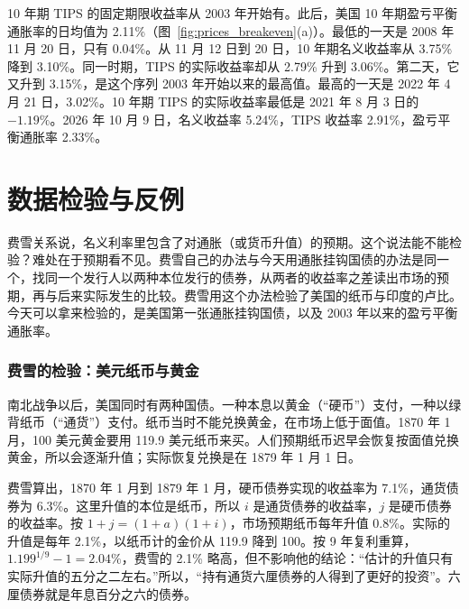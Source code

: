 10 年期 TIPS 的固定期限收益率从 2003 年开始有。此后，美国 10 年期盈亏平衡通胀率的日均值为 2.11\%（图~\ref{fig:prices_breakeven}(a)）。最低的一天是 2008 年 11 月 20 日，只有 0.04\%。从 11 月 12 日到 20 日，10 年期名义收益率从 3.75\% 降到 3.10\%。同一时期，TIPS 的实际收益率却从 2.79\% 升到 3.06\%。第二天，它又升到 3.15\%，是这个序列 2003 年开始以来的最高值。最高的一天是 2022 年 4 月 21 日，3.02\%。10 年期 TIPS 的实际收益率最低是 2021 年 8 月 3 日的 $-1.19\%$。2026 年 10 月 9 日，名义收益率 5.24\%，TIPS 收益率 2.91\%，盈亏平衡通胀率 2.33\%\cite{fred2026}。


\section{数据检验与反例}\label{sec:prices-test}

费雪关系说，名义利率里包含了对通胀（或货币升值）的预期。这个说法能不能检验？难处在于预期看不见。费雪自己的办法与今天用通胀挂钩国债的办法是同一个，找同一个发行人以两种本位发行的债券，从两者的收益率之差读出市场的预期，再与后来实际发生的比较。费雪用这个办法检验了美国的纸币与印度的卢比。今天可以拿来检验的，是美国第一张通胀挂钩国债，以及 2003 年以来的盈亏平衡通胀率。

\subsubsection{费雪的检验：美元纸币与黄金}
南北战争以后，美国同时有两种国债。一种本息以黄金（“硬币”）支付，一种以绿背纸币（“通货”）支付。纸币当时不能兑换黄金，在市场上低于面值。1870 年 1 月，100 美元黄金要用 119.9 美元纸币来买。人们预期纸币迟早会恢复按面值兑换黄金，所以会逐渐升值；实际恢复兑换是在 1879 年 1 月 1 日\cite{fisher1896}。

费雪算出，1870 年 1 月到 1879 年 1 月，硬币债券实现的收益率为 7.1\%，通货债券为 6.3\%。这里升值的本位是纸币，所以 $i$ 是通货债券的收益率，$j$ 是硬币债券的收益率。按 $1+j=(1+a)(1+i)$，市场预期纸币每年升值 0.8\%。实际的升值是每年 2.1\%，以纸币计的金价从 119.9 降到 100\cite{fisher1896}。按 9 年复利重算，$1.199^{1/9}-1=2.04\%$，费雪的 2.1\% 略高，但不影响他的结论：“估计的升值只有实际升值的五分之二左右。”所以，“持有通货六厘债券的人得到了更好的投资”\cite{fisher1896}。六厘债券就是年息百分之六的债券。

